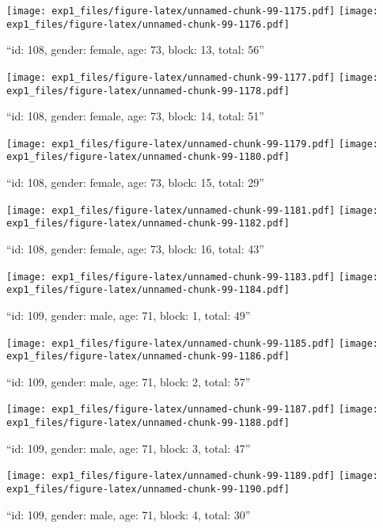 \documentclass[,]{article}
\begin{document}
\texttt{[image: exp1\_files/figure-latex/unnamed-chunk-99-1175.pdf]}
\texttt{[image: exp1\_files/figure-latex/unnamed-chunk-99-1176.pdf]}

\newpage
[1] 

``id: 108, gender: female, age: 73, block: 13, total: 56''

\texttt{[image: exp1\_files/figure-latex/unnamed-chunk-99-1177.pdf]}
\texttt{[image: exp1\_files/figure-latex/unnamed-chunk-99-1178.pdf]}

\newpage
[1] 

``id: 108, gender: female, age: 73, block: 14, total: 51''

\texttt{[image: exp1\_files/figure-latex/unnamed-chunk-99-1179.pdf]}
\texttt{[image: exp1\_files/figure-latex/unnamed-chunk-99-1180.pdf]}

\newpage
[1] 

``id: 108, gender: female, age: 73, block: 15, total: 29''

\texttt{[image: exp1\_files/figure-latex/unnamed-chunk-99-1181.pdf]}
\texttt{[image: exp1\_files/figure-latex/unnamed-chunk-99-1182.pdf]}

\newpage
[1] 

``id: 108, gender: female, age: 73, block: 16, total: 43''

\texttt{[image: exp1\_files/figure-latex/unnamed-chunk-99-1183.pdf]}
\texttt{[image: exp1\_files/figure-latex/unnamed-chunk-99-1184.pdf]}

\newpage
[1] 

``id: 109, gender: male, age: 71, block: 1, total: 49''

\texttt{[image: exp1\_files/figure-latex/unnamed-chunk-99-1185.pdf]}
\texttt{[image: exp1\_files/figure-latex/unnamed-chunk-99-1186.pdf]}

\newpage
[1] 

``id: 109, gender: male, age: 71, block: 2, total: 57''

\texttt{[image: exp1\_files/figure-latex/unnamed-chunk-99-1187.pdf]}
\texttt{[image: exp1\_files/figure-latex/unnamed-chunk-99-1188.pdf]}

\newpage
[1] 

``id: 109, gender: male, age: 71, block: 3, total: 47''

\texttt{[image: exp1\_files/figure-latex/unnamed-chunk-99-1189.pdf]}
\texttt{[image: exp1\_files/figure-latex/unnamed-chunk-99-1190.pdf]}

\newpage
[1] 

``id: 109, gender: male, age: 71, block: 4, total: 30''
\end{document}
